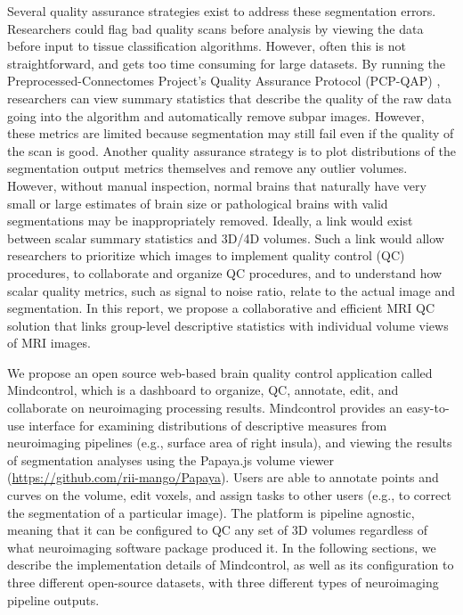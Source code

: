 Several quality assurance strategies exist to address these segmentation errors. Researchers could flag bad quality scans before analysis by viewing the data before input to tissue classification algorithms.  However, often this is not straightforward, and gets too time consuming for large datasets. By running the Preprocessed-Connectomes Project’s Quality Assurance Protocol (PCP-QAP) \cite{shehzadpreprocessed}, researchers can view summary statistics that describe the quality of the raw data going into the algorithm and automatically remove subpar images. However, these metrics are limited because segmentation may still fail even if the quality of the scan is good. Another quality assurance strategy is to plot distributions of the segmentation output metrics themselves and remove any outlier volumes. However, without manual inspection, normal brains that naturally have very small or large estimates of brain size or pathological brains with valid segmentations may be inappropriately removed. Ideally, a link would exist between scalar summary statistics and 3D/4D volumes. Such a link would allow researchers to prioritize which images to implement quality control (QC) procedures, to collaborate and organize QC procedures, and to understand how scalar quality metrics, such as signal to noise ratio, relate to the actual image and segmentation. In this report, we propose a collaborative and efficient MRI QC solution that links group-level descriptive statistics with individual volume views of MRI images.  

We propose an open source web-based brain quality control application called Mindcontrol, which is a dashboard to organize, QC, annotate, edit, and collaborate on neuroimaging processing results. Mindcontrol provides an easy-to-use interface for examining distributions of descriptive measures from neuroimaging pipelines (e.g., surface area of right insula), and viewing the results of segmentation analyses using the Papaya.js volume viewer (\href{https://github.com/rii-mango/Papaya}{https://github.com/rii-mango/Papaya}). Users are able to annotate points and curves on the volume, edit voxels, and assign tasks to other users (e.g., to correct the segmentation of a particular image). The platform is pipeline agnostic, meaning that it can be configured to QC any set of 3D volumes regardless of what neuroimaging software package produced it. In the following sections, we describe the implementation details of Mindcontrol, as well as its configuration to three different open-source datasets, with three different types of neuroimaging pipeline outputs. 

